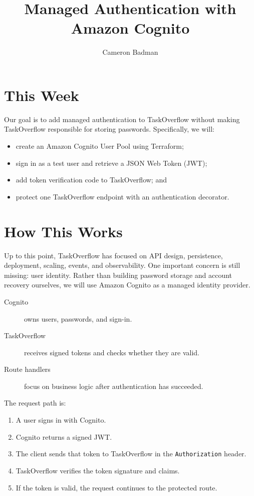 \documentclass{csse4400}
\title{Managed Authentication with Amazon Cognito}
\author{Cameron Badman}
\date{\week[practical]{10}}
\begin{document}
\maketitle


\section{This Week}
Our goal is to add managed authentication to TaskOverflow without making TaskOverflow responsible for storing passwords.
Specifically, we will:
\begin{itemize}
  \item create an Amazon Cognito User Pool using Terraform;
  \item sign in as a test user and retrieve a JSON Web Token (JWT);
  \item add token verification code to TaskOverflow; and
  \item protect one TaskOverflow endpoint with an authentication decorator.
\end{itemize}

\section{How This Works}

Up to this point, TaskOverflow has focused on API design, persistence, deployment, scaling, events, and observability.
One important concern is still missing: user identity.
Rather than building password storage and account recovery ourselves, we will use Amazon Cognito as a managed identity provider.

\begin{description}
  \item[Cognito] owns users, passwords, and sign-in.
  \item[TaskOverflow] receives signed tokens and checks whether they are valid.
  \item[Route handlers] focus on business logic after authentication has succeeded.
\end{description}

The request path is:
\begin{enumerate}
  \item A user signs in with Cognito.
  \item Cognito returns a signed JWT.
  \item The client sends that token to TaskOverflow in the \texttt{Authorization} header.
  \item TaskOverflow verifies the token signature and claims.
  \item If the token is valid, the request continues to the protected route.
\end{enumerate}
\end{document}
